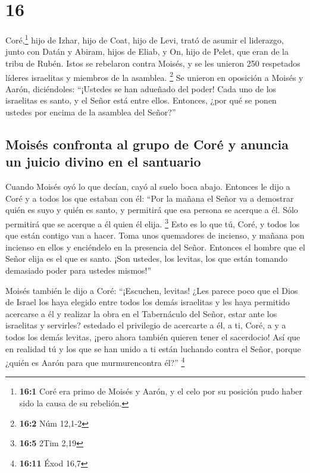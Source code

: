 \hypertarget{section-15}{%
\section{16}\label{section-15}}

 Coré,\footnote{\textbf{16:1} Coré era primo de Moisés y
  Aarón, y el celo por su posición pudo haber sido la causa de su
  rebelión.} hijo de Izhar, hijo de Coat, hijo de Levi, trató de asumir
el liderazgo, junto con Datán y Abiram, hijos de Eliab, y On, hijo de
Pelet, que eran de la tribu de Rubén.  Istos se rebelaron
contra Moisés, y se les unieron 250 respetados líderes israelitas y
miembros de la asamblea. \footnote{\textbf{16:2} Núm 12,1-2}
 Se unieron en oposición a Moisés y Aarón, diciéndoles:
``¡Ustedes se han adueñado del poder! Cada uno de los israelitas es
santo, y el Señor está entre ellos. Entonces, ¿por qué se ponen ustedes
por encima de la asamblea del Señor?''

\hypertarget{moisuxe9s-confronta-al-grupo-de-coruxe9-y-anuncia-un-juicio-divino-en-el-santuario}{%
\subsection{Moisés confronta al grupo de Coré y anuncia un juicio divino
en el
santuario}\label{moisuxe9s-confronta-al-grupo-de-coruxe9-y-anuncia-un-juicio-divino-en-el-santuario}}

 Cuando Moisés oyó lo que decían, cayó al suelo boca
abajo.  Entonces le dijo a Coré y a todos los que estaban
con él: ``Por la mañana el Señor va a demostrar quién es suyo y quién es
santo, y permitirá que esa persona se acerque a él. Sólo permitirá que
se acerque a él quien él elija. \footnote{\textbf{16:5} 2Tim 2,19}
 Esto es lo que tú, Coré, y todos los que están contigo
van a hacer. Toma unos quemadores de incienso,  y mañana
pon incienso en ellos y enciéndelo en la presencia del Señor. Entonces
el hombre que el Señor elija es el que es santo. ¡Son ustedes, los
levitas, los que están tomando demasiado poder para ustedes mismos!''

 Moisés también le dijo a Coré: ``¡Escuchen, levitas!
 ¿Les parece poco que el Dios de Israel los haya elegido
entre todos los demás israelitas y les haya permitido acercarse a él y
realizar la obra en el Tabernáculo del Señor, estar ante los israelitas
y servirles?  estedado el privilegio de acercarte a él, a
ti, Coré, a y a todos los demás levitas, ¡pero ahora también quieren
tener el sacerdocio!  Así que en realidad tú y los que se
han unido a ti están luchando contra el Señor, porque ¿quién es Aarón
para que murmurencontra él?'' \footnote{\textbf{16:11} Éxod 16,7}

